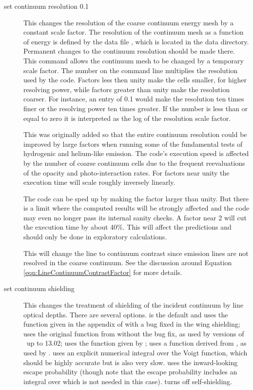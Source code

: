 \begin{description}
\item[set continuum resolution 0.1]  This changes the resolution of the coarse
continuum energy mesh by a constant scale factor.  The resolution of the
continuum mesh as a function of energy is defined by the data file
, which is located in the data directory.  Permanent
changes to the continuum resolution should be made there.
This command
allows the continuum mesh to be changed by a temporary scale factor.
The
number on the command line multiplies the resolution used by the code.
Factors less then unity make the cells smaller, for higher
resolving power, while factors greater than unity make the resolution coarser.
For instance, an entry of 0.1 would make the resolution ten times finer
or the resolving power ten times greater.
If the number is less than or equal to zero
it is interpreted as the log of the resolution scale factor.

This was originally added so that the entire continuum resolution
could be improved by large factors when running some of the
fundamental tests
of hydrogenic and helium-like emission.
The code's execution speed is
affected by the number of coarse continuum cells due to the frequent
reevaluations of the opacity and photo-interaction rates.
For factors near
unity the execution time will scale roughly inversely linearly.

The code can be sped up by making the factor larger than unity.
But
there is a limit where the computed results will be strongly affected
and the code may even no longer pass its internal sanity checks.
A factor
near 2 will cut the execution time by about 40\%.
This will affect the
predictions and should only be done in exploratory calculations.

This will change the line to continuum contrast since emission lines are not resolved in the coarse continuum.
See the discussion around Equation \ref{eqn:LineContinuumContrastFactor} for more details.

\item[set continuum shielding] This changes the treatment of shielding
  of the incident continuum by line optical depths.  There are several
  options.   is the default and uses the function
  given in the appendix of \citet{Federman1979} with a bug fixed in
  the wing shielding;  uses the original function from
  \citet{Federman1979} without the bug fix, as used by versions of
  \Cloudy\ up to 13.02;  uses the function given by
  \citet{Ferland1992};  uses a function derived
  from \citet{Rodgers1974}, as used by \citet{Draine1996}.
   uses an explicit numerical integral over the
  Voigt function, which should be highly accurate but is also very
  slow.  uses the inward-looking escape probability
  (though note that the escape probability includes an integral over
  which is not needed in this case).  turns off
  self-shielding.


\end{description}
